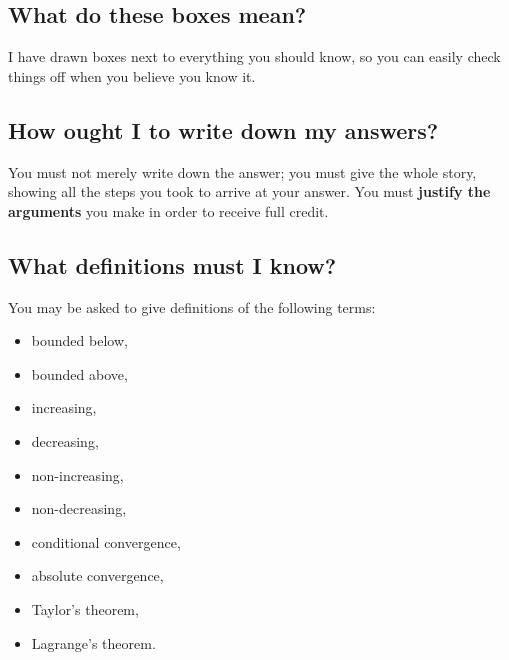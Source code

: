 \documentclass[12pt]{article}
\theoremstyle{definition}
\begin{document}



\subsection*{What do these boxes mean?}

I have drawn boxes next to everything you should know, so you can
easily check things off when you believe you know it.

\subsection*{How ought I to write down my answers?}

You must not merely write down the answer; you must give the whole
story, showing all the steps you took to arrive at your answer.  You
must \textbf{justify the arguments} you make in order to receive full
credit.

\subsection*{What definitions must I know?}

You may be asked to give definitions of the following terms: 
\begin{multicols}{3}
\begin{itemize}
\item bounded below,
\item bounded above,
\item increasing,
\item decreasing,
\item non-increasing,
\item non-decreasing,
\item conditional convergence,
\item absolute convergence,
\item Taylor's theorem,
\item Lagrange's theorem.
\end{itemize}
\end{multicols}
\end{document}
